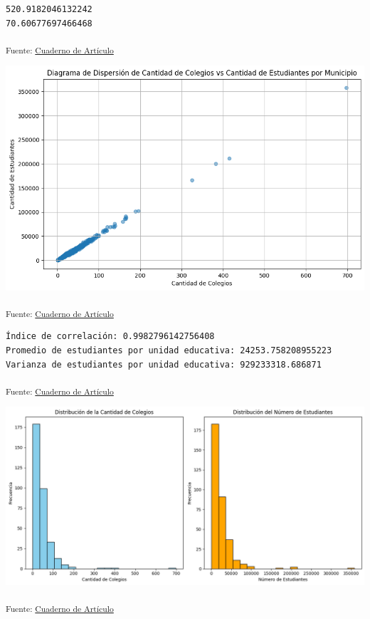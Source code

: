 \documentclass[
  12pt]{article}
\begin{document}
\begin{verbatim}
520.9182046132242
70.60677697466468
\end{verbatim}

\textsubscript{Fuente: \href{sociest.org/index.ipynb.html}{Cuaderno de
Artículo}}

\includegraphics{index_files/figure-pdf/cell-11-output-1.png}

\textsubscript{Fuente: \href{sociest.org/index.ipynb.html}{Cuaderno de
Artículo}}

\begin{verbatim}
Índice de correlación: 0.9982796142756408
Promedio de estudiantes por unidad educativa: 24253.758208955223
Varianza de estudiantes por unidad educativa: 929233318.686871
\end{verbatim}

\textsubscript{Fuente: \href{sociest.org/index.ipynb.html}{Cuaderno de
Artículo}}

\includegraphics{index_files/figure-pdf/cell-13-output-1.png}

\textsubscript{Fuente: \href{sociest.org/index.ipynb.html}{Cuaderno de
Artículo}}
\end{document}
